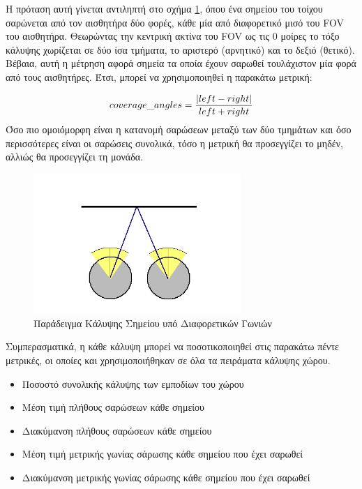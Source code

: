 Η πρόταση αυτή γίνεται αντιληπτή στο σχήμα \ref{fig:different_angle_cover_example}, όπου ένα σημείου του τοίχου σαρώνεται από τον αισθητήρα δύο φορές, κάθε μία από διαφορετικό μισό του FOV του αισθητήρα. Θεωρώντας την κεντρική ακτίνα του FOV ως τις 0 μοίρες το τόξο κάλυψης χωρίζεται σε δύο ίσα τμήματα, το αριστερό (αρνητικό) και το δεξιό (θετικό). Βέβαια, αυτή η μέτρηση αφορά σημεία τα οποία έχουν σαρωθεί τουλάχιστον μία φορά από τους αισθητήρες. Έτσι, μπορεί να χρησιμοποιηθεί η παρακάτω μετρική:

\[coverage\_angles = \frac{\lvert left - right\rvert}{left + right}\]
Όσο πιο ομοιόμορφη είναι η κατανομή σαρώσεων μεταξύ των δύο τμημάτων και όσο περισσότερες είναι οι σαρώσεις συνολικά, τόσο η μετρική θα προσεγγίζει το μηδέν, αλλιώς θα προσεγγίζει τη μονάδα.

\begin{figure}[!htb]
    \centering
    \includegraphics[width=0.7\textwidth]{./images/chapter5/different_angle_cover_example.png}
    \caption{Παράδειγμα Κάλυψης Σημείου υπό Διαφορετικών Γωνιών}
    \label{fig:different_angle_cover_example}
\end{figure}

Συμπερασματικά, η κάθε κάλυψη μπορεί να ποσοτικοποιηθεί στις παρακάτω πέντε μετρικές, οι οποίες και χρησιμοποιήθηκαν σε όλα τα πειράματα κάλυψης χώρου.
\begin{itemize}
    \setlength\itemsep{-0.2em}
    \item Ποσοστό συνολικής κάλυψης των εμποδίων του χώρου
    \item Μέση τιμή πλήθους σαρώσεων κάθε σημείου
    \item Διακύμανση πλήθους σαρώσεων κάθε σημείου
    \item Μέση τιμή μετρικής γωνίας σάρωσης κάθε σημείου που έχει σαρωθεί
    \item Διακύμανση μετρικής γωνίας σάρωσης κάθε σημείου που έχει σαρωθεί
\end{itemize}


